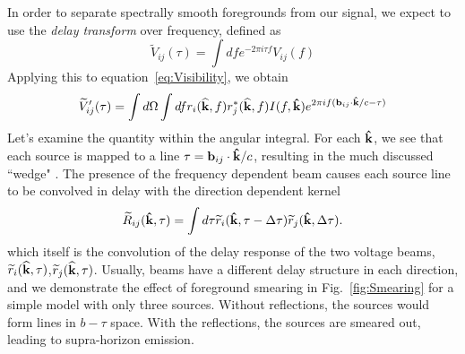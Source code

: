 \documentclass[onecolumn]{emulateapj}
\begin{document}
In order to separate spectrally smooth foregrounds from our signal, we expect to use the {\it delay transform} over frequency, defined as \citep{Parsons:2012}
\begin{equation}
\widetilde{V}_{ij}(\tau) = \int d f e^{-2 \pi i \tau f} V_{ij}(f)
\end{equation}
Applying this to equation~\ref{eq:Visibility}, we obtain
\begin{equation}
\widetilde{V}'_{ij}(\tau)=  \int d \Omega \int d f  r_i({\bf \widehat{k}},f) r_j^*({\bf \widehat{k}},f)  I(f,{\bf \hat{k}}) e^{2 \pi i f ( {\bf b}_{ij} \cdot {\bf \hat{k}} /c - \tau)}
\end{equation}
Let's examine the quantity within the angular integral. For each ${\bf \hat{k}}$, we see that each source is mapped to a line $\tau ={\bf b}_{ij}\cdot{\bf \hat{k}}/c$, resulting in the much discussed ``wedge" \citep{Datta:2010,Vedantham:2012,Parsons:2012,Morales:2013,Thyagarajan:2013,Liu:2014a,Liu:2014b}. The presence of the frequency dependent beam causes each source line to be convolved in delay with the direction dependent kernel
\begin{equation}\label{eq:Kernel}
\widetilde{R}_{ij}({\bf \hat{k}},\tau) = \int d \tau \widetilde{r}_i({\bf \hat{k}},\tau - \Delta \tau) \widetilde{r}_j({\bf \hat{k}},\Delta \tau).
\end{equation}
which itself is the convolution of the delay response of the two voltage beams, $\widetilde{r}_i({\bf \widehat{k}},\tau)$,$\widetilde{r}_j({\bf \widehat{k}},\tau)$. Usually, beams have a different delay structure in each direction, and we demonstrate the effect of foreground smearing in Fig.~\ref{fig:Smearing} for a simple model with only three sources. Without reflections, the sources would form lines in $b-\tau$ space. With the reflections, the sources are smeared out, leading to supra-horizon emission. 
\end{document}
